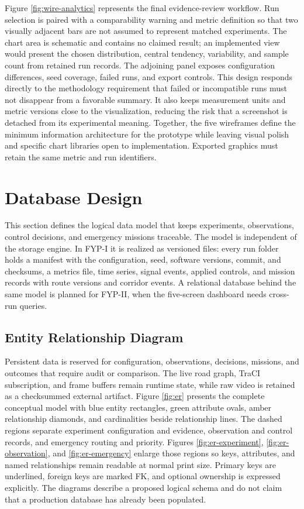 Figure \ref{fig:wire-analytics} represents the final evidence-review workflow. Run selection is paired with a comparability warning and metric definition so that two visually adjacent bars are not assumed to represent matched experiments. The chart area is schematic and contains no claimed result; an implemented view would present the chosen distribution, central tendency, variability, and sample count from retained run records. The adjoining panel exposes configuration differences, seed coverage, failed runs, and export controls. This design responds directly to the methodology requirement that failed or incompatible runs must not disappear from a favorable summary. It also keeps measurement units and metric versions close to the visualization, reducing the risk that a screenshot is detached from its experimental meaning. Together, the five wireframes define the minimum information architecture for the prototype while leaving visual polish and specific chart libraries open to implementation. Exported graphics must retain the same metric and run identifiers.


\section{Database Design}
\label{sec:data-design}

This section defines the logical data model that keeps experiments, observations, control decisions, and emergency missions traceable. The model is independent of the storage engine. In FYP-I it is realized as versioned files: every run folder holds a manifest with the configuration, seed, software versions, commit, and checksums, a metrics file, time series, signal events, applied controls, and mission records with route versions and corridor events. A relational database behind the same model is planned for FYP-II, when the five-screen dashboard needs cross-run queries.

\subsection{Entity Relationship Diagram}

Persistent data is reserved for configuration, observations, decisions, missions, and outcomes that require audit or comparison. The live road graph, TraCI subscription, and frame buffers remain runtime state, while raw video is retained as a checksummed external artifact. Figure \ref{fig:er} presents the complete conceptual model with blue entity rectangles, green attribute ovals, amber relationship diamonds, and cardinalities beside relationship lines. The dashed regions separate experiment configuration and evidence, observation and control records, and emergency routing and priority. Figures \ref{fig:er-experiment}, \ref{fig:er-observation}, and \ref{fig:er-emergency} enlarge those regions so keys, attributes, and named relationships remain readable at normal print size. Primary keys are underlined, foreign keys are marked FK, and optional ownership is expressed explicitly. The diagrams describe a proposed logical schema and do not claim that a production database has already been populated.


